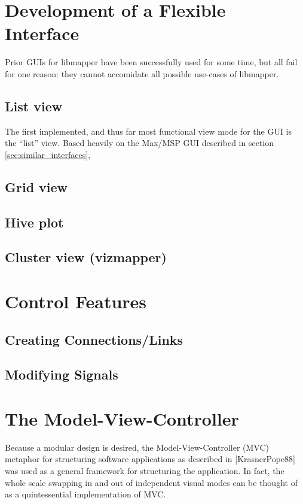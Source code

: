\section{Development of a Flexible Interface}
	
Prior GUIs for libmapper have been successfully used for some time, but all fail for one reason: they cannot accomidate all possible use-cases of libmapper. 

\subsection{List view}
\label{sec:list_view}

The first implemented, and thus far most functional view mode for the GUI is the ``list'' view. Based heavily on the Max/MSP GUI described in section \ref{sec:similar_interfaces}, 

\subsection{Grid view}
\subsection{Hive plot}
\subsection{Cluster view (vizmapper)}

\section{Control Features}
\subsection{Creating Connections/Links}
\subsection{Modifying Signals}

\section{The Model-View-Controller}

	Because a modular design is desired, the Model-View-Controller (MVC) metaphor for structuring software applications as described in [KrasnerPope88] was used as a general framework for structuring the application. In fact, the whole scale swapping in and out of independent visual modes can be thought of as a quintessential implementation of MVC. 
	
